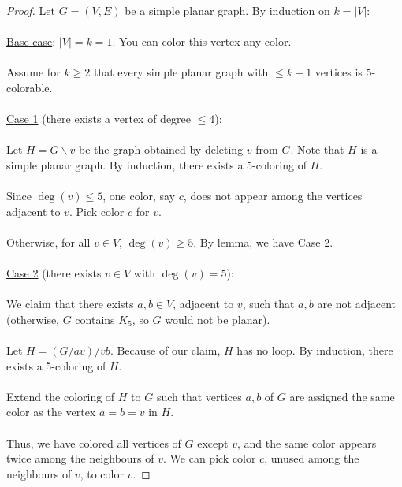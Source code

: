 \documentclass[]{article}
\theoremstyle{definition}
\begin{document}
			\begin{proof}
				Let $G = (V, E)$ be a simple planar graph. By induction on $k = |V|$:
				\\ \\
				\underline{Base case}: $|V| = k = 1$. You can color this vertex any color.
				\\ \\
				Assume for $k \ge 2$ that every simple planar graph with $\le k - 1$ vertices is 5-colorable.
				\\ \\
				\underline{Case 1} (there exists a vertex of degree $\le 4$):
				\\ \\
				Let $H = G \backslash v$ be the graph obtained by deleting $v$ from $G$. Note that $H$ is a simple planar graph. By induction, there exists a 5-coloring of $H$.
				\\ \\
				Since $\deg(v) \le 5$, one color, say $c$, does not appear among the vertices adjacent to $v$. Pick color $c$ for $v$.
				\\ \\
				Otherwise, for all $v \in V$, $\deg(v) \ge 5$. By lemma, we have Case 2.
				\\ \\
				\underline{Case 2} (there exists $v \in V$ with $\deg(v) = 5$):
				\\ \\
				We claim that there exists $a, b \in V$, adjacent to $v$, such that $a, b$ are not adjacent (otherwise, $G$ contains $K_5$, so $G$ would not be planar).
				\\ \\
				Let $H = (G/av)/vb$. Because of our claim, $H$ has no loop. By induction, there exists a 5-coloring of $H$.
				\\ \\
				Extend the coloring of $H$ to $G$ such that vertices $a, b$ of $G$ are assigned the same color as the vertex $a = b = v$ in $H$.
				\\ \\
				Thus, we have colored all vertices of $G$ except $v$, and the same color appears twice among the neighbours of $v$. We can pick color $c$, unused among the neighbours of $v$, to color $v$.
			\end{proof}
		
\end{document}

